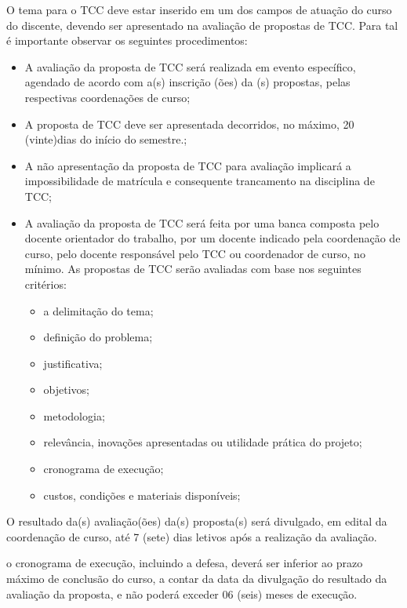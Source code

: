 	 O tema para o TCC deve estar inserido em um dos campos de atuação do curso do discente, devendo ser apresentado na avaliação de propostas de TCC. Para tal é importante observar os seguintes procedimentos:
	 
	 \begin{itemize}
		 \item A avaliação da proposta de TCC será realizada em evento específico, agendado de acordo com a(s) inscrição (ões) da (s) propostas, pelas respectivas coordenações de curso;

		 \item A proposta de TCC deve ser apresentada decorridos, no máximo, 20 (vinte)dias do início do semestre.;

		 \item A não apresentação da proposta de TCC para avaliação implicará a impossibilidade de matrícula e consequente trancamento na disciplina de TCC;

		 \item A avaliação da proposta de TCC será feita por uma banca composta pelo docente orientador do trabalho, por um docente indicado pela coordenação de curso, pelo docente responsável pelo TCC ou coordenador de curso, no mínimo. As propostas de TCC serão avaliadas com base nos seguintes critérios: 
		 \begin{itemize}
		 	\item a delimitação do tema; 
			\item definição do problema; 
			\item justificativa; 
			\item objetivos; 
			\item metodologia; 
			\item relevância, inovações apresentadas ou utilidade prática do projeto; 
			\item cronograma de execução; 
			\item custos, condições e materiais disponíveis; 
		 \end{itemize}
	\end{itemize}
		
O resultado da(s) avaliação(ões) da(s) proposta(s) será divulgado, em edital da coordenação de curso, até 7 (sete) dias letivos após a realização da avaliação. 

o cronograma de execução, incluindo a defesa, deverá ser inferior ao prazo máximo de conclusão do curso, a contar da data da divulgação do resultado da avaliação da proposta, e não poderá exceder 06 (seis) meses de execução. 

